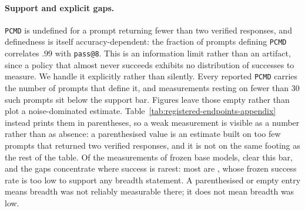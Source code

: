 \documentclass{article}
\newcommand{\1}{\mathbf 1}
\newcommand{\pmd}{\texttt{PCMD}}
\theoremstyle{remark}
\theoremstyle{definition}
\theoremstyle{plain}
\begin{document}
\paragraph{Support and explicit gaps.}
\pmd{} is undefined for a prompt returning fewer than two verified responses,
and definedness is itself accuracy-dependent: the fraction of prompts defining
\pmd{} correlates $.99$ with \texttt{pass@8}. This is an information limit
rather than an artifact, since a policy that almost never succeeds exhibits no
distribution of successes to measure. We handle it explicitly rather than
silently. Every reported \pmd{} carries the number of prompts that define it, and
measurements resting on fewer than 30 such prompts sit below the support bar.
Figures leave those empty rather than plot a noise-dominated estimate.
Table~\ref{tab:registered-endpoints-appendix} instead prints them in
parentheses, so a weak measurement is visible as a number rather than as
absence: a parenthesised value is an estimate built on too few prompts that
returned two verified responses, and it is not on the same footing as the rest
of the table. Of the \MDcells{} measurements of frozen base models, \MDreportable{} clear
this bar, and the gaps concentrate where success is rarest: most are
\MDtopgapdomain{}, whose frozen success rate is too low to support any
breadth statement. A parenthesised or empty entry means breadth was
not reliably measurable there; it does not mean breadth was low.
\end{document}
